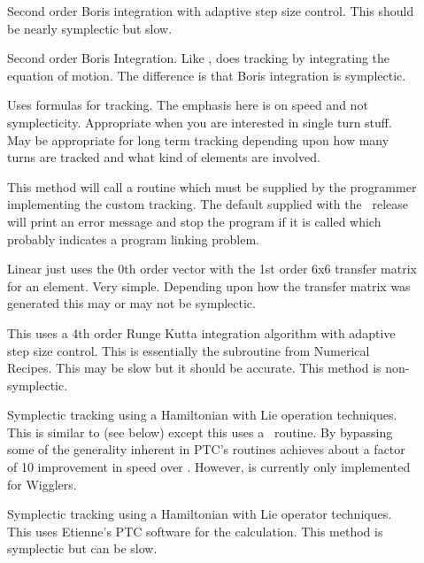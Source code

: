 \begin{description}
\item[]
Second order Boris integration\cite{b:boris} with adaptive step size control.
This should be nearly symplectic but slow.

\item[]
Second order Boris Integration. Like ,  does
tracking by integrating the equation of motion. The difference is that
Boris integration is symplectic.

\item[]
Uses formulas for tracking. The emphasis here is on speed and not
symplecticity. Appropriate when you are interested in single turn
stuff. May be appropriate for long term tracking depending upon how
many turns are tracked and what kind of elements are involved. 

\item[]
This method will call a routine  which must be
supplied by the programmer implementing the custom tracking. The
default  supplied with the \bmad\ release will print
an error message and stop the program if it is called which probably
indicates a program linking problem.

\item[]
Linear just uses the 0th order vector with the 1st order 6x6 transfer
matrix for an element. Very simple.  Depending upon how the transfer
matrix was generated this may or may not be symplectic.

\item[]
This uses a 4th order Runge Kutta integration algorithm with adaptive
step size control.  This is essentially the  subroutine
from Numerical Recipes\cite{b:nr}. This may be slow but it should be
accurate. This method is non-symplectic.

\item[]
Symplectic tracking using a Hamiltonian with Lie operation techniques.
This is similar to  (see below) except this uses a
\bmad\ routine. By bypassing some of the generality inherent in PTC's routines
 achieves about a factor of 10 improvement in speed over
. However,  is
currently only implemented for Wigglers.

\item[]
Symplectic tracking using a Hamiltonian with Lie operator techniques.
This uses Etienne's PTC software for the calculation. This method is
symplectic but can be slow.


\end{description}
